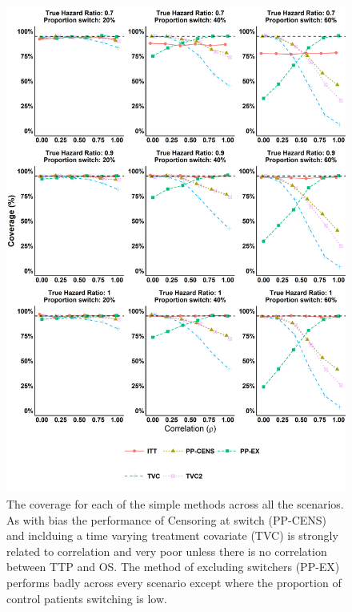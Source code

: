 \begin{figure}[ht]
\centering
\includegraphics[width=13cm]{images/chap_sim2/simple_cov.png}
\caption{\label{F:chap_sim2:simp_cov} The coverage for each of the simple methods across all the scenarios. As with bias the performance of Censoring at switch (PP-CENS) and inclduing a time varying treatment covariate (TVC) is strongly related to correlation and very poor unless there is no correlation between TTP and OS. The method of excluding switchers (PP-EX) performs badly across every scenario except where the proportion of control patients switching is low.} 
\end{figure}

